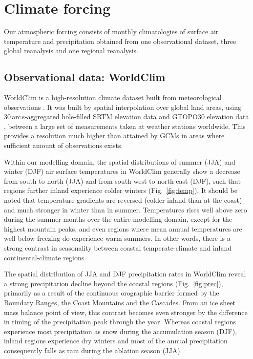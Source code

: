 \section{Climate forcing}
\label{sec:climate}

Our atmospheric forcing consists of monthly climatologies of surface air temperature and precipitation obtained from one observational dataset, three global reanalysis and one regional reanalysis.

\subsection{Observational data: WorldClim}

WorldClim is a high-resolution climate dataset built from meteorological observations \citep{data:worldclim}. It was built by spatial interpolation over global land areas, using 30\,arc\,s-aggregated hole-filled SRTM elevation data \citep{data:srtm} and GTOPO30 elevation data \citep{data:gtopo30}, between a large set of measurements taken at weather stations worldwide. This provides a resolution much higher than attained by GCMs in areas where sufficient amount of observations exists.

Within our modelling domain, the spatial distributions of summer (JJA) and winter (DJF) air surface temperatures in WorldClim generally show a decrease from south to north (JJA) and from south-west to north-east (DJF), such that regions further inland experience colder winters (Fig.~\ref{fig:temp}). It should be noted that temperature gradients are reversed (colder inland than at the coast) and much stronger in winter than in summer. Temperatures rises well above zero during the summer months over the entire modelling domain, except for the highest mountain peaks, and even regions where mean annual temperatures are well below freezing do experience warm summers. In other words, there is a strong contrast in seasonality between coastal temperate-climate and inland continental-climate regions.

The spatial distribution of JJA and DJF precipitation rates in WorldClim reveal a strong precipitation decline beyond the coastal regions (Fig.~\ref{fig:prec}), primarily as a result of the continuous orographic barrier formed by the Boundary Ranges, the Coast Mountains and the Cascades. From an ice sheet mass balance point of view, this contrast becomes even stronger by the difference in timing of the precipitation peak through the year. Whereas coastal regions experience most precipitation as snow during the accumulation season (DJF), inland regions experience dry winters and most of the annual precipitation consequently falls as rain during the ablation season (JJA).

